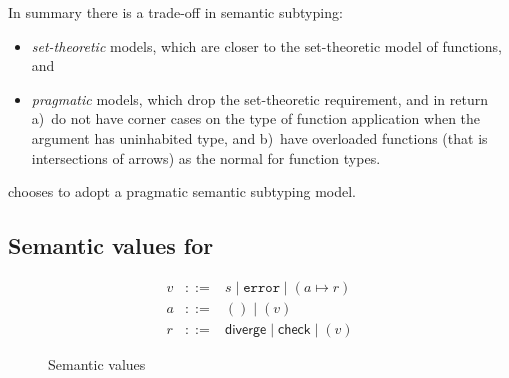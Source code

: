 \documentclass[acmsmall,review,screen]{acmart}
\newcommand{\ERROR}{\mathtt{error}}
\newcommand{\DIVERGE}{\mathsf{diverge}}
\newcommand{\CHECK}{\mathsf{check}}
\begin{document}
In summary there is a trade-off in semantic subtyping:
\begin{itemize}
  
\item \emph{set-theoretic} models, which are closer to the set-theoretic model
  of functions, and

\item \emph{pragmatic} models, which drop the set-theoretic requirement, and in return
  a)~do not have corner cases on the type of function application when the argument has uninhabited type, and
  b)~have overloaded functions (that is intersections of arrows) as the normal for function types.
  
\end{itemize}
 chooses to adopt a pragmatic semantic subtyping model.

\subsection{Semantic values for }

\begin{figure}
  
\[\begin{array}{rcl}
  v & ::= & s \mid \ERROR \mid (a \mapsto r) \\
  a & ::= & () \mid (v) \\
  r & ::= & \DIVERGE \mid \CHECK \mid (v) 
\end{array}\]
\caption{Semantic values}
\label{fig:semval}

\end{figure}
\end{document}
